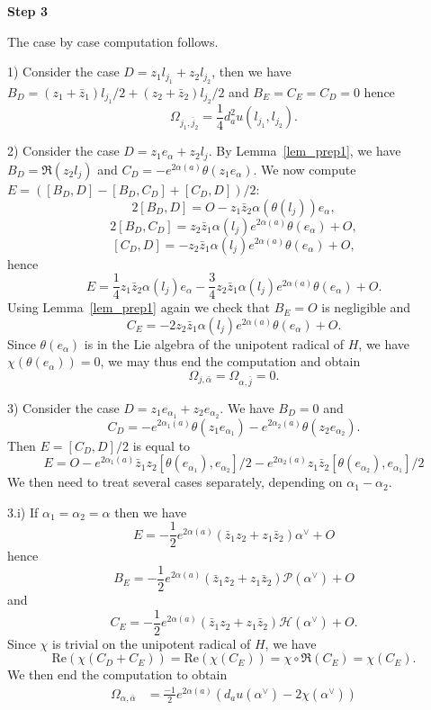 \documentclass{amsart}
\theoremstyle{definition}
\begin{document}
\textbf{Step 3}

The case by case computation follows.

1) 
Consider the case $D=z_1l_{j_1}+z_2l_{j_2}$, then 
we have $B_D=(z_1+\bar{z}_1)l_{j_1}/2+(z_2+\bar{z}_2)l_{j_2}/2$ and 
$B_E=C_E=C_D=0$ hence 
\[
\Omega_{j_1,\bar{j}_2} =
\frac{1}{4} d^2_a u(l_{j_1},l_{j_2}). 
\]

2) 
Consider the case $D=z_1e_{\alpha}+z_2l_j$.
By Lemma~\ref{lem_prep1}, we have $B_D= \Re(z_2l_j)$ and 
$C_D=-e^{2\alpha(a)}\theta(z_1 e_{\alpha})$.
We now compute $E=([B_D,D]-[B_D,C_D]+[C_D,D])/2$: 
\[ 
2[B_D,D]=O-z_1\bar{z}_2\alpha(\theta(l_j))e_{\alpha},
\]
\[
2[B_D,C_D]=z_2\bar{z}_1\alpha(l_j)e^{2\alpha(a)}\theta(e_{\alpha})+O,
\]
\[
[C_D,D]=-z_2\bar{z}_1\alpha(l_j)e^{2\alpha(a)}\theta(e_{\alpha})+O,
\]
hence
\[
E = \frac{1}{4}z_1\bar{z}_2\alpha(l_j)e_{\alpha} - \frac{3}{4}
z_2\bar{z}_1\alpha(l_j)e^{2\alpha(a)}\theta(e_{\alpha})+O.
\]
Using Lemma~\ref{lem_prep1} again we check that $B_E=O$ is negligible and 
\[
C_E=-2z_2\bar{z}_1\alpha(l_j)e^{2\alpha(a)}\theta(e_{\alpha})+O.
\]
Since $\theta(e_{\alpha})$ is in the Lie algebra of the unipotent radical of 
$H$, we have $\chi(\theta(e_{\alpha}))=0$, we may thus end the 
computation and obtain
\[
\Omega_{j,\bar{\alpha}}=\Omega_{\alpha,\bar{j}}=0.
\]

3) Consider the case $D=z_1e_{\alpha_1}+z_2e_{\alpha_2}$.
We have $B_D=0$ and 
\[
C_D=-e^{2\alpha_1(a)}\theta(z_1e_{\alpha_1})-e^{2\alpha_2(a)}\theta(z_2e_{\alpha_2}).
\]
Then $E=[C_D,D]/2$ is equal to 
\[
E = O -e^{2\alpha_1(a)}\bar{z}_1z_2[\theta(e_{\alpha_1}),e_{\alpha_2}]/2 
 -e^{2\alpha_2(a)}z_1\bar{z}_2[\theta(e_{\alpha_2}),e_{\alpha_1}]/2 
\]
We then need to treat several cases separately, depending on $\alpha_1-\alpha_2$. 

3.i) 
If $\alpha_1=\alpha_2=\alpha$ then we have 
\[
E = -\frac{1}{2}e^{2\alpha(a)}(\bar{z}_1z_2+z_1\bar{z}_2)\alpha^{\vee} +O
\]
hence 
\[
B_E =-\frac{1}{2}e^{2\alpha(a)}(\bar{z}_1z_2+z_1\bar{z}_2)\mathcal{P}(\alpha^{\vee}) +O
\] 
and 
\[
C_E=-\frac{1}{2}e^{2\alpha(a)}(\bar{z}_1z_2+z_1\bar{z}_2)\mathcal{H}(\alpha^{\vee}) +O. 
\]
Since $\chi$ is trivial on the unipotent radical of $H$, we have 
\[
\mathrm{Re}(\chi(C_D+C_E))=\mathrm{Re}(\chi(C_E))=
\chi\circ \Re(C_E)=\chi(C_E).
\]
We then end the computation to obtain 
\begin{align*}
\Omega_{\alpha,\bar{\alpha}} & = \frac{-1}{2}e^{2\alpha(a)}(d_au(\alpha^{\vee})
-2\chi(\alpha^{\vee})) 
\end{align*}
\end{document}
